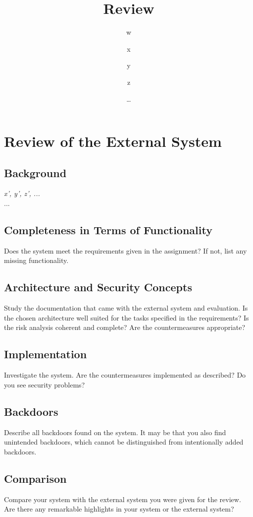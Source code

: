\documentclass{article}
\title{\huge\sffamily\bfseries Review}
\author{ w \and x \and y \and z}
\date{\dots}
\begin{document}
\maketitle

\tableofcontents
\pagebreak



\section{Review of the External System}

\subsection{Background}

 {\it x', y', z', ...} \\

 ...

\subsection{Completeness in Terms of Functionality} 

Does the system meet the requirements given in the assignment? If not, list any missing functionality.


\subsection{Architecture and Security Concepts}

Study the documentation that came with the external system and
evaluation.
Is the chosen architecture well suited for the tasks specified in the 
requirements?  Is the risk analysis coherent and complete?   Are the
countermeasures appropriate?

\subsection{Implementation}

Investigate the system. Are the countermeasures implemented as described? Do you see security problems?


\subsection{Backdoors}

Describe all backdoors found on the system. 
It may be that you also find unintended backdoors, which cannot be distinguished from intentionally added backdoors.



\subsection{Comparison}

Compare your system with the external system you were given for the
review.   Are there any remarkable highlights in your system or the external system?
\end{document}
